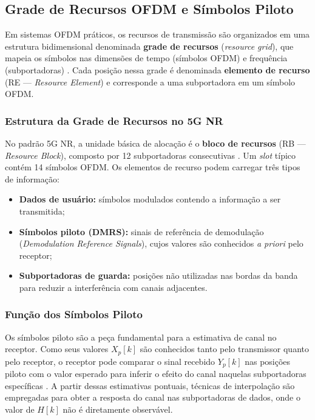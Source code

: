 \documentclass[conference]{IEEEtran}
\begin{document}
\subsection{Grade de Recursos OFDM e Símbolos Piloto}

Em sistemas OFDM práticos, os recursos de transmissão são organizados em uma estrutura bidimensional denominada \textbf{grade de recursos} (\textit{resource grid}), que mapeia os símbolos nas dimensões de tempo (símbolos OFDM) e frequência (subportadoras) \cite{3gpp38211}. Cada posição nessa grade é denominada \textbf{elemento de recurso} (RE --- \textit{Resource Element}) e corresponde a uma subportadora em um símbolo OFDM.

\subsubsection{Estrutura da Grade de Recursos no 5G NR}

No padrão 5G NR, a unidade básica de alocação é o \textbf{bloco de recursos} (RB --- \textit{Resource Block}), composto por 12 subportadoras consecutivas \cite{3gpp38211}. Um \textit{slot} típico contém 14 símbolos OFDM. Os elementos de recurso podem carregar três tipos de informação:
\begin{itemize}
    \item \textbf{Dados de usuário:} símbolos modulados contendo a informação a ser transmitida;
    \item \textbf{Símbolos piloto (DMRS):} sinais de referência de demodulação (\textit{Demodulation Reference Signals}), cujos valores são conhecidos \textit{a priori} pelo receptor;
    \item \textbf{Subportadoras de guarda:} posições não utilizadas nas bordas da banda para reduzir a interferência com canais adjacentes.
\end{itemize}

\subsubsection{Função dos Símbolos Piloto}

Os símbolos piloto são a peça fundamental para a estimativa de canal no receptor. Como seus valores $X_p[k]$ são conhecidos tanto pelo transmissor quanto pelo receptor, o receptor pode comparar o sinal recebido $Y_p[k]$ nas posições piloto com o valor esperado para inferir o efeito do canal naquelas subportadoras específicas \cite{haykin2001, vanDeBeek1995}. A partir dessas estimativas pontuais, técnicas de interpolação são empregadas para obter a resposta do canal nas subportadoras de dados, onde o valor de $H[k]$ não é diretamente observável.
\end{document}
